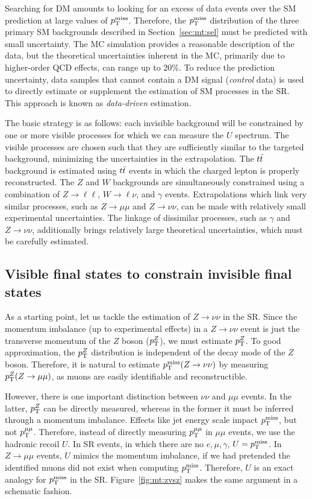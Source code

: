 Searching for DM amounts to looking for an excess of data events over the SM prediction at large values of $p_\mathrm{T}^\mathrm{miss}$.
Therefore, the $p_\mathrm{T}^\mathrm{miss}$ distribution of the three primary SM backgrounds described in Section~\ref{sec:mt:sel} must be predicted with small uncertainty.
The MC simulation provides a reasonable description of the data, but the theoretical uncertainties inherent in the MC, primarily due to higher-order QCD effects, can range up to $20\%$.
To reduce the prediction uncertainty, data samples that cannot contain a DM signal (\emph{control} data) is used to directly estimate or supplement the estimation of SM processes in the SR.
This approach is known as \emph{data-driven} estimation.

The basic strategy is as follows: each invisible background will be constrained by one or more visible processes for which we can measure the $U$ spectrum.
The visible processes are chosen such that they are sufficiently similar to the targeted background, minimizing the uncertainties in the extrapolation.
The $t\bar{t}$ background is estimated using $t\bar{t}$ events in which the charged lepton is properly reconstructed.
The $Z$ and $W$ backgrounds are simultaneously constrained using a combination of $Z\rightarrow\ell\ell$, $W\rightarrow\ell\nu$, and $\gamma$ events.
Extrapolations which link very similar processes, such as $Z\rightarrow\mu\mu$ and $Z\rightarrow\nu\nu$, can be made with relatively small experimental uncertainties.
The linkage of dissimilar processes, such as $\gamma$ and $Z\rightarrow\nu\nu$, additionally brings relatively large theoretical uncertainties, which must be carefully estimated.

\subsection{Visible final states to constrain invisible final states}

As a starting point, let us tackle the estimation of $Z\rightarrow\nu\nu$ in the SR.
Since the momentum imbalance (up to experimental effects) in a $Z\rightarrow\nu\nu$ event is just the transverse momentum of the $Z$ boson ($p_\mathrm{T}^Z$), we must estimate $p_\mathrm{T}^Z$.
To good approximation, the $p_\mathrm{T}^Z$ distribution is independent of the decay mode of the $Z$ boson.
Therefore, it is natural to estimate $p_\mathrm{T}^\mathrm{miss}(Z\rightarrow\nu\nu)$ by measuring $p_\mathrm{T}^Z(Z\rightarrow\mu\mu)$, as muons are easily identifiable and reconstructible.

However, there is one important distinction between $\nu\nu$ and $\mu\mu$ events.
In the latter, $p_\mathrm{T}^Z$ can be directly measured, whereas in the former it must be inferred through a momentum imbalance.
Effects like jet energy scale impact $p_\mathrm{T}^\mathrm{miss}$, but not $p_\mathrm{T}^{\mu\mu}$.
Therefore, instead of directly measuring $p_\mathrm{T}^{\mu\mu}$ in $\mu\mu$ events, we use the hadronic recoil $U$.
In SR events, in which there are no $e,\mu,\gamma$, $U = p_\mathrm{T}^\mathrm{miss}$.
In $Z\rightarrow\mu\mu$ events, $U$ mimics the momentum imbalance, if we had pretended the identified muons did not exist when computing $p_\mathrm{T}^\mathrm{miss}$.
Therefore, $U$ is an exact analogy for $p_\mathrm{T}^\mathrm{miss}$ in the SR.
Figure~\ref{fig:mt:zvsz} makes the same argument in a schematic fashion.

